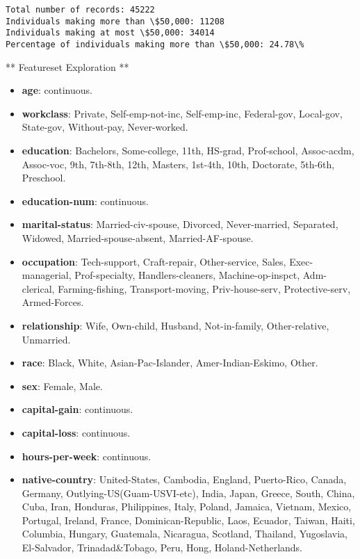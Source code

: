 \documentclass[11pt]{article}
\providecommand{\tightlist}{%
      \setlength{\itemsep}{0pt}\setlength{\parskip}{0pt}}
\begin{document}
    \begin{Verbatim}[commandchars=\\\{\}]
Total number of records: 45222
Individuals making more than \$50,000: 11208
Individuals making at most \$50,000: 34014
Percentage of individuals making more than \$50,000: 24.78\%

    \end{Verbatim}

    ** Featureset Exploration **

\begin{itemize}
\tightlist
\item
  \textbf{age}: continuous.
\item
  \textbf{workclass}: Private, Self-emp-not-inc, Self-emp-inc,
  Federal-gov, Local-gov, State-gov, Without-pay, Never-worked.
\item
  \textbf{education}: Bachelors, Some-college, 11th, HS-grad,
  Prof-school, Assoc-acdm, Assoc-voc, 9th, 7th-8th, 12th, Masters,
  1st-4th, 10th, Doctorate, 5th-6th, Preschool.
\item
  \textbf{education-num}: continuous.
\item
  \textbf{marital-status}: Married-civ-spouse, Divorced, Never-married,
  Separated, Widowed, Married-spouse-absent, Married-AF-spouse.
\item
  \textbf{occupation}: Tech-support, Craft-repair, Other-service, Sales,
  Exec-managerial, Prof-specialty, Handlers-cleaners, Machine-op-inspct,
  Adm-clerical, Farming-fishing, Transport-moving, Priv-house-serv,
  Protective-serv, Armed-Forces.
\item
  \textbf{relationship}: Wife, Own-child, Husband, Not-in-family,
  Other-relative, Unmarried.
\item
  \textbf{race}: Black, White, Asian-Pac-Islander, Amer-Indian-Eskimo,
  Other.
\item
  \textbf{sex}: Female, Male.
\item
  \textbf{capital-gain}: continuous.
\item
  \textbf{capital-loss}: continuous.
\item
  \textbf{hours-per-week}: continuous.
\item
  \textbf{native-country}: United-States, Cambodia, England,
  Puerto-Rico, Canada, Germany, Outlying-US(Guam-USVI-etc), India,
  Japan, Greece, South, China, Cuba, Iran, Honduras, Philippines, Italy,
  Poland, Jamaica, Vietnam, Mexico, Portugal, Ireland, France,
  Dominican-Republic, Laos, Ecuador, Taiwan, Haiti, Columbia, Hungary,
  Guatemala, Nicaragua, Scotland, Thailand, Yugoslavia, El-Salvador,
  Trinadad\&Tobago, Peru, Hong, Holand-Netherlands.
\end{itemize}
\end{document}

